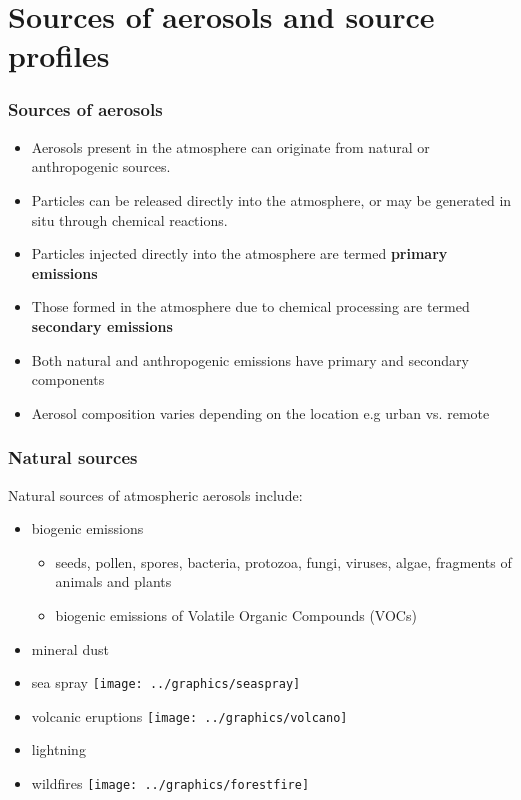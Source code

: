 ﻿\documentclass[ignorenonframetext]{beamer}
\begin{document}
\section{Sources of aerosols and source profiles}

\begin{frame}
\frametitle{Sources of aerosols}
\begin{itemize}
\item Aerosols present in the atmosphere can originate from natural or
anthropogenic sources.
\item Particles can be released directly into the atmosphere, or may be
generated in situ through chemical reactions.
\item Particles injected directly into the atmosphere are termed \textbf{primary
emissions}
\item Those formed in the atmosphere due to chemical processing are
termed \textbf{secondary emissions}
\item Both natural and anthropogenic emissions have primary and
secondary components
\item Aerosol composition varies depending on the location e.g urban vs. remote
\end{itemize}
\end{frame}

\begin{frame}
\frametitle{Natural sources}
Natural sources of atmospheric aerosols include:
\begin{itemize}
\item biogenic emissions
	\begin{itemize}
		\item seeds, pollen, spores, bacteria, protozoa, fungi, viruses, algae,
fragments of animals and plants
		\item biogenic emissions of Volatile Organic Compounds (VOCs)
	\end{itemize}
\item mineral dust
\item sea spray \hspace{1in} \texttt{[image: ../graphics/seaspray]}
\item volcanic eruptions \hspace{1in} \texttt{[image: ../graphics/volcano]}
\item lightning
\item wildfires \hspace{1in} \texttt{[image: ../graphics/forestfire]}

\end{itemize}
\end{frame}
\end{document}
